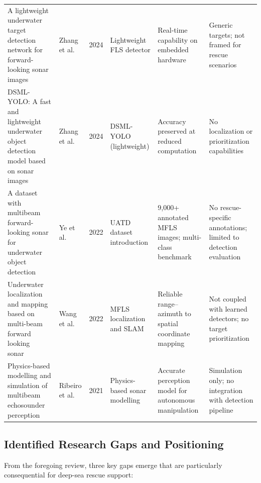\documentclass[conference]{IEEEtran}
\begin{document}
\begin{table}[!t]
\begin{tabularx}{\textwidth}{@{} p{3.6cm} l c p{2.4cm} p{3.0cm} p{3.0cm} @{}}
\addlinespace
A lightweight underwater target detection network for forward-looking sonar images~\cite{ref17} & Zhang et al. & 2024 & Lightweight FLS detector & Real-time capability on embedded hardware & Generic targets; not framed for rescue scenarios \\
\addlinespace
DSML-YOLO: A fast and lightweight underwater object detection model based on sonar images~\cite{ref18} & Zhang et al. & 2024 & DSML-YOLO (lightweight) & Accuracy preserved at reduced computation & No localization or prioritization capabilities \\
\addlinespace
A dataset with multibeam forward-looking sonar for underwater object detection~\cite{ref10} & Ye et al. & 2022 & UATD dataset introduction & 9,000+ annotated MFLS images; multi-class benchmark & No rescue-specific annotations; limited to detection evaluation \\
\addlinespace
Underwater localization and mapping based on multi-beam forward looking sonar~\cite{ref3} & Wang et al. & 2022 & MFLS localization and SLAM & Reliable range--azimuth to spatial coordinate mapping & Not coupled with learned detectors; no target prioritization \\
\addlinespace
Physics-based modelling and simulation of multibeam echosounder perception~\cite{ref5} & Ribeiro et al. & 2021 & Physics-based sonar modelling & Accurate perception model for autonomous manipulation & Simulation only; no integration with detection pipeline \\

\bottomrule
\end{tabularx}
\renewcommand{\arraystretch}{1.0}
\end{table}

\subsection{Identified Research Gaps and Positioning}

From the foregoing review, three key gaps emerge that are particularly consequential for deep-sea rescue support:
\end{document}
